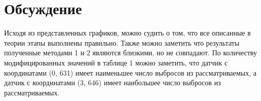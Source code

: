 \section{Обсуждение}
Исходя из представленных графиков, можно судить о том, что все описанные в теории этапы выполнены правильно. Также можно заметить что результаты полученные методами 1 и 2 являются близкими, но не совпадают. По количеству модифицированных значений в таблице 1 можно заметить, что датчик с координатами (0, 631) имеет наименьшее число выбросов из рассматриваемых, а датчик с координатами (3, 646) имеет наибольшее число выбросов из рассматриваемых.